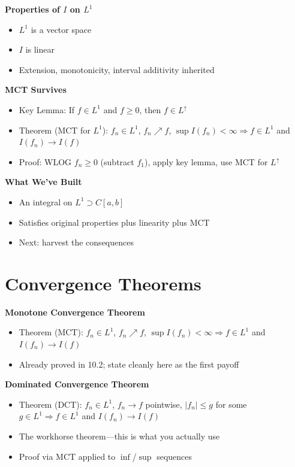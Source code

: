 \documentclass[
  10pt,
  letterpaper,
]{scrbook}
\providecommand{\tightlist}{%
  \setlength{\itemsep}{0pt}\setlength{\parskip}{0pt}}
\begin{document}
\textbf{Properties of \(I\) on \(L^1\)}

\begin{itemize}
\tightlist
\item
  \(L^1\) is a vector space
\item
  \(I\) is linear
\item
  Extension, monotonicity, interval additivity inherited
\end{itemize}

\textbf{MCT Survives}

\begin{itemize}
\tightlist
\item
  Key Lemma: If \(f \in L^1\) and \(f \geq 0\), then
  \(f \in L^\uparrow\)
\item
  Theorem (MCT for \(L^1\)): \(f_n \in L^1\), \(f_n \nearrow f\),
  \(\sup I(f_n) < \infty \Rightarrow f \in L^1\) and \(I(f_n) \to I(f)\)
\item
  Proof: WLOG \(f_n \geq 0\) (subtract \(f_1\)), apply key lemma, use
  MCT for \(L^\uparrow\)
\end{itemize}

\textbf{What We've Built}

\begin{itemize}
\tightlist
\item
  An integral on \(L^1 \supset C[a,b]\)
\item
  Satisfies original properties plus linearity plus MCT
\item
  Next: harvest the consequences
\end{itemize}

\section{Convergence Theorems}\label{convergence-theorems}

\textbf{Monotone Convergence Theorem}

\begin{itemize}
\tightlist
\item
  Theorem (MCT): \(f_n \in L^1\), \(f_n \nearrow f\),
  \(\sup I(f_n) < \infty \Rightarrow f \in L^1\) and \(I(f_n) \to I(f)\)
\item
  Already proved in 10.2; state cleanly here as the first payoff
\end{itemize}

\textbf{Dominated Convergence Theorem}

\begin{itemize}
\tightlist
\item
  Theorem (DCT): \(f_n \in L^1\), \(f_n \to f\) pointwise,
  \(|f_n| \leq g\) for some \(g \in L^1 \Rightarrow f \in L^1\) and
  \(I(f_n) \to I(f)\)
\item
  The workhorse theorem---this is what you actually use
\item
  Proof via MCT applied to \(\inf\)/\(\sup\) sequences
\end{itemize}
\end{document}

